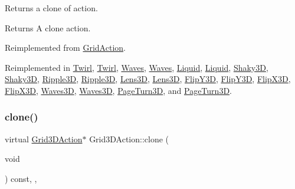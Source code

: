 Returns a clone of action.

\begin{DoxyReturn}{Returns}
A clone action. 
\end{DoxyReturn}


Reimplemented from \hyperlink{classGridAction_a081a9340e9289cf2dcbb6bde121d4f24}{Grid\+Action}.



Reimplemented in \hyperlink{classTwirl_a9121ce0fe151b7f7224caab88f688aab}{Twirl}, \hyperlink{classTwirl_a49ec654e932aa851844dac90fa0cc65c}{Twirl}, \hyperlink{classWaves_a9da6486c1749a9e6cb8966a45897a077}{Waves}, \hyperlink{classWaves_a4d92fc4a2d0d52f24310b4b9df4ae547}{Waves}, \hyperlink{classLiquid_a18fdff260e28b3bb195563cd8e60fdc3}{Liquid}, \hyperlink{classLiquid_ae1ca20f6c336cad86c748c547d1b4420}{Liquid}, \hyperlink{classShaky3D_adaf0dbadf0e32fab853579c4b8df966b}{Shaky3D}, \hyperlink{classShaky3D_a419f771e52c23750ac4eab5808b76b1b}{Shaky3D}, \hyperlink{classRipple3D_a79b0876958a8e7403d8be5f6e2adfd24}{Ripple3D}, \hyperlink{classRipple3D_a704ef078cca9cde6c85acbcd8e11cc4e}{Ripple3D}, \hyperlink{classLens3D_ad628edf64ecd2f4fe17a6ae7530cf2b7}{Lens3D}, \hyperlink{classLens3D_a7b97fe4349267d8a3a7404e8bc19aa33}{Lens3D}, \hyperlink{classFlipY3D_a4553fc238ade03f1926ba12458ad073b}{Flip\+Y3D}, \hyperlink{classFlipY3D_a797e0c0669bd83473d66dc8d77d49daa}{Flip\+Y3D}, \hyperlink{classFlipX3D_a82c67645ce0cfa6435a7266c00359a94}{Flip\+X3D}, \hyperlink{classFlipX3D_a3c8f037e07f76fbccb63a960c763a947}{Flip\+X3D}, \hyperlink{classWaves3D_a7f9f49bce0ebd46fc200d208a984b5bf}{Waves3D}, \hyperlink{classWaves3D_ab41b6156741e145fbd6c3626bc16ec25}{Waves3D}, \hyperlink{classPageTurn3D_a4679e461471010cd87932c11be5bef9a}{Page\+Turn3D}, and \hyperlink{classPageTurn3D_a98aa1300a97553c4f4185d974021bdc4}{Page\+Turn3D}.

\mbox{\label{classGrid3DAction_a01d5b2d60654ef66d6551ac2190ed14c}} 
\subsubsection{\texorpdfstring{clone()}{clone()}\hspace{0.1cm}{\footnotesize\ttfamily [2/2]}}
{\footnotesize\ttfamily virtual \hyperlink{classGrid3DAction}{Grid3\+D\+Action}$\ast$ Grid3\+D\+Action\+::clone (\begin{DoxyParamCaption}\item[{void}]{ }\end{DoxyParamCaption}) const\hspace{0.3cm}{\ttfamily [inline]}, {\ttfamily [override]}, {\ttfamily [virtual]}}

